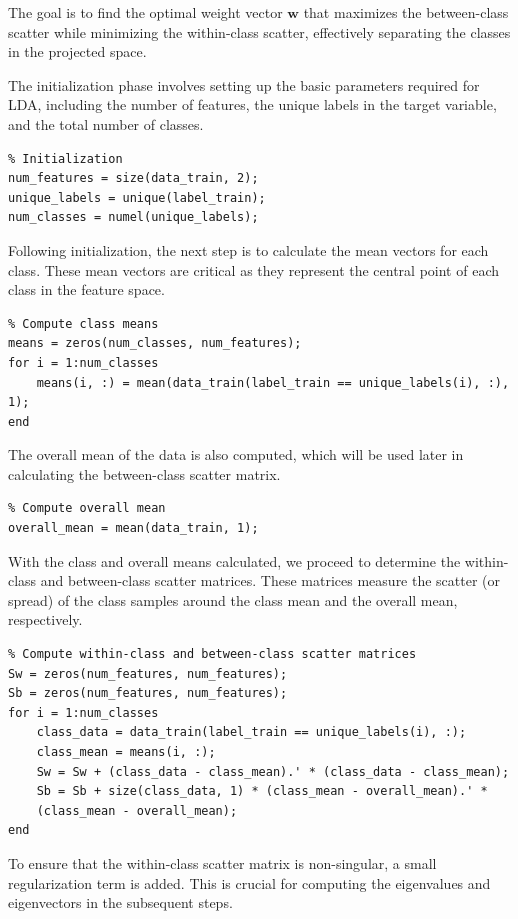 \documentclass[12pt, onecolumn]{article}
\begin{document}
The goal is to find the optimal weight vector \( \mathbf{w} \) that maximizes the between-class scatter while minimizing the within-class scatter, effectively separating the classes in the projected space.

The initialization phase involves setting up the basic parameters required for LDA, including the number of features, the unique labels in the target variable, and the total number of classes.

\begin{verbatim}
% Initialization
num_features = size(data_train, 2);
unique_labels = unique(label_train);
num_classes = numel(unique_labels);
\end{verbatim}

Following initialization, the next step is to calculate the mean vectors for each class. These mean vectors are critical as they represent the central point of each class in the feature space.

\begin{verbatim}
% Compute class means
means = zeros(num_classes, num_features);
for i = 1:num_classes
    means(i, :) = mean(data_train(label_train == unique_labels(i), :), 1);
end
\end{verbatim}

The overall mean of the data is also computed, which will be used later in calculating the between-class scatter matrix.

\begin{verbatim}
% Compute overall mean
overall_mean = mean(data_train, 1);
\end{verbatim}

With the class and overall means calculated, we proceed to determine the within-class and between-class scatter matrices. These matrices measure the scatter (or spread) of the class samples around the class mean and the overall mean, respectively.

\begin{verbatim}
% Compute within-class and between-class scatter matrices
Sw = zeros(num_features, num_features); 
Sb = zeros(num_features, num_features); 
for i = 1:num_classes
    class_data = data_train(label_train == unique_labels(i), :);
    class_mean = means(i, :);
    Sw = Sw + (class_data - class_mean).' * (class_data - class_mean);
    Sb = Sb + size(class_data, 1) * (class_mean - overall_mean).' * 
    (class_mean - overall_mean);
end
\end{verbatim}

To ensure that the within-class scatter matrix is non-singular, a small regularization term is added. This is crucial for computing the eigenvalues and eigenvectors in the subsequent steps.
\end{document}
